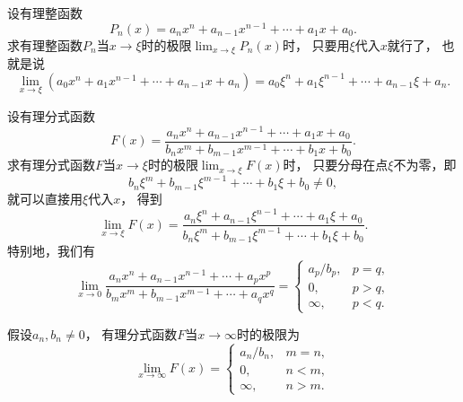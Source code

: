 \begin{example}
设有理整函数\[
	P_n(x) = a_n x^n + a_{n-1} x^{n-1} + \dotsb + a_1 x + a_0.
\]
求有理整函数\(P_n\)当\(x\to\xi\)时的极限\(\lim_{x\to\xi} P_n(x)\)时，
只要用\(\xi\)代入\(x\)就行了，
也就是说\begin{equation}\label{equation:函数极限.重要极限3}
	\lim_{x \to \xi} (a_0 x^n + a_1 x^{n-1} + \dotsb + a_{n-1} x + a_n)
	= a_0 \xi^n + a_1 \xi^{n-1} + \dotsb + a_{n-1} \xi + a_n.
\end{equation}
\end{example}

\begin{example}
设有理分式函数\[
	F(x)
	= \frac{a_n x^n + a_{n-1} x^{n-1} + \dotsb + a_1 x + a_0}
	{b_n x^m + b_{m-1} x^{m-1} + \dotsb + b_1 x + b_0}.
\]
求有理分式函数\(F\)当\(x\to\xi\)时的极限\(\lim_{x\to\xi} F(x)\)时，
只要分母在点\(\xi\)不为零，即\[
	b_n \xi^m + b_{m-1} \xi^{m-1} + \dotsb + b_1 \xi + b_0 \neq 0,
\]
就可以直接用\(\xi\)代入\(x\)，
得到\begin{equation}\label{equation:函数极限.重要极限4}
	\lim_{x\to\xi} F(x)
	= \frac{a_n \xi^n + a_{n-1} \xi^{n-1} + \dotsb + a_1 \xi + a_0}
	{b_n \xi^m + b_{m-1} \xi^{m-1} + \dotsb + b_1 \xi + b_0}.
\end{equation}
特别地，我们有\begin{equation}\label{equation:函数极限.重要极限5}
	\lim_{x\to0} \frac{a_n x^n + a_{n-1} x^{n-1} + \dotsb + a_p x^p}
	{b_m x^m + b_{m-1} x^{m-1} + \dotsb + a_q x^q}
	= \left\{ \begin{array}{cl}
		a_p/b_p, & p=q, \\
		0, & p>q, \\
		\infty, & p<q.
	\end{array} \right.
\end{equation}

假设\(a_n,b_n\neq0\)，
有理分式函数\(F\)当\(x\to\infty\)时的极限为\begin{equation}\label{equation:函数极限.重要极限6}
	\lim_{x\to\infty} F(x)
	= \left\{ \begin{array}{cl}
		a_n/b_n, & m=n, \\
		0, & n<m, \\
		\infty, & n>m.
	\end{array} \right.
\end{equation}
\end{example}

